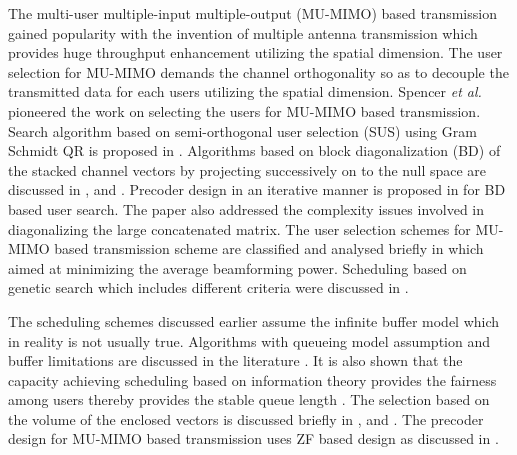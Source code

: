 The multi-user multiple-input multiple-output (MU-MIMO) based transmission gained popularity with the invention of multiple antenna transmission which provides huge throughput enhancement utilizing the spatial dimension. The user selection for MU-MIMO demands the channel orthogonality so as to decouple the transmitted data for each users utilizing the spatial dimension. Spencer {\it et al.} \cite{spencer2004zero} pioneered the work on selecting the users for MU-MIMO based transmission. Search algorithm based on semi-orthogonal user selection (SUS) using Gram Schmidt QR is proposed in \cite{sus2006zfbf}. Algorithms based on block diagonalization (BD) of the stacked channel vectors by projecting successively on to the null space are discussed in \cite{shen2006low}, \cite{youtuan2007improved} and \cite{dimic2005downlink}. Precoder design in an iterative manner is proposed in \cite{traniterative} for BD based user search. The paper also addressed the complexity issues involved in diagonalizing the large concatenated matrix. The user selection schemes for MU-MIMO based transmission scheme are classified and analysed briefly in \cite{zhang2007user} which aimed at minimizing the average beamforming power. Scheduling based on genetic search which includes different criteria were discussed in \cite{genetic_search}.



The scheduling schemes discussed earlier assume the infinite buffer model which in reality is not usually true. Algorithms with queueing model assumption and buffer limitations are discussed in the literature \cite{queuevsinfo}. It is also shown that the capacity achieving scheduling based on information theory provides the fairness among users thereby provides the stable queue length \cite{queuevsinfo}. The selection based on the volume of the enclosed vectors is discussed briefly in \cite{jin2010novel}, \cite{wang2010maximum} and \cite{ko2012determinant}. The precoder design for MU-MIMO based transmission uses ZF based design as discussed in \cite{wiesel2008zero}.
